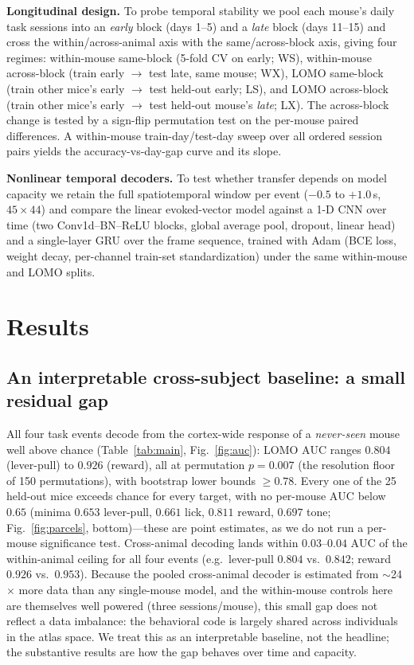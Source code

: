 \documentclass{article}
\newcommand{\auc}{\mathrm{AUC}}
\begin{document}
\textbf{Longitudinal design.} To probe temporal stability we pool each mouse's daily task sessions
into an \emph{early} block (days 1--5) and a \emph{late} block (days 11--15) and cross the
within/across-animal axis with the same/across-block axis, giving four regimes: within-mouse
same-block (5-fold CV on early; WS), within-mouse across-block (train early $\to$ test late, same
mouse; WX), LOMO same-block (train other mice's early $\to$ test held-out early; LS), and LOMO
across-block (train other mice's early $\to$ test held-out mouse's \emph{late}; LX). The
across-block change is tested by a sign-flip permutation test on the per-mouse paired differences.
A within-mouse train-day/test-day sweep over all ordered session pairs yields the
accuracy-vs-day-gap curve and its slope.

\textbf{Nonlinear temporal decoders.} To test whether transfer depends on model capacity we retain
the full spatiotemporal window per event ($-0.5$ to $+1.0$\,s, $45{\times}44$) and compare the
linear evoked-vector model against a 1-D CNN over time (two Conv1d--BN--ReLU blocks, global
average pool, dropout, linear head) and a single-layer GRU over the frame sequence, trained with
Adam (BCE loss, weight decay, per-channel train-set standardization) under the same within-mouse
and LOMO splits.

\section{Results}

\subsection{An interpretable cross-subject baseline: a small residual gap}
\label{sec:main}
All four task events decode from the cortex-wide response of a \emph{never-seen} mouse well above
chance (Table~\ref{tab:main}, Fig.~\ref{fig:auc}): LOMO $\auc$ ranges $0.804$ (lever-pull) to
$0.926$ (reward), all at permutation $p=0.007$ (the resolution floor of 150 permutations), with
bootstrap lower bounds $\geq 0.78$. Every one of the 25 held-out mice exceeds chance for every
target, with no per-mouse $\auc$ below $0.65$ (minima $0.653$ lever-pull, $0.661$ lick, $0.811$
reward, $0.697$ tone; Fig.~\ref{fig:parcels}, bottom)---these are point estimates, as we do not
run a per-mouse significance test. Cross-animal decoding lands within $0.03$--$0.04$ $\auc$ of the
within-animal ceiling for all four events (e.g.\ lever-pull $0.804$ vs.\ $0.842$; reward $0.926$
vs.\ $0.953$). Because the pooled cross-animal decoder is estimated from $\sim$24$\times$ more
data than any single-mouse model, and the within-mouse controls here are themselves well powered
(three sessions/mouse), this small gap does not reflect a data imbalance: the behavioral code is
largely shared across individuals in the atlas space. We treat this as an interpretable baseline,
not the headline; the substantive results are how the gap behaves over time and capacity.
\end{document}
